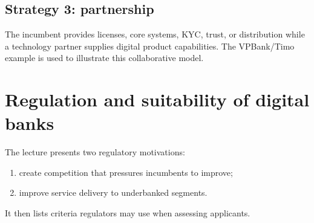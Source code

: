 \subsection{Strategy 3: partnership}

The incumbent provides licenses, core systems, KYC, trust, or distribution while a technology partner supplies digital product capabilities. The VPBank/Timo example is used to illustrate this collaborative model.

\begin{mlfigure}
\end{mlfigure}

\section{Regulation and suitability of digital banks}

The lecture presents two regulatory motivations:

\begin{enumerate}
  \item create competition that pressures incumbents to improve;
  \item improve service delivery to underbanked segments.
\end{enumerate}

It then lists criteria regulators may use when assessing applicants.

